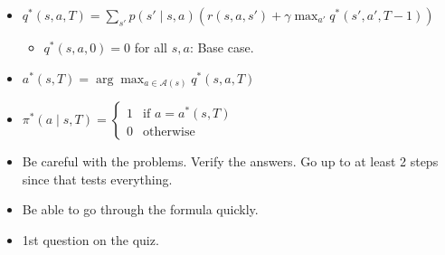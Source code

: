 \begin{warning}
    \begin{itemize}
        \item $q^*(s,a,T) = \sum_{s'} p(s' \mid s, a) \left( r(s, a, s') + \gamma \max_{a'} q^*(s',a',T-1) \right)$
        \begin{itemize}
            \item $q^*(s,a,0) = 0$ for all $s,a$: Base case.
        \end{itemize}
        \item $a^*(s,T) = \arg \max_{a \in \mathcal{A}(s)} q^* (s,a,T)$
        \item $\pi^*(a \mid s,T) = \begin{cases}
                1 & \text{if } a = a^*(s,T) \\
                0 & \text{otherwise}
            \end{cases}$ \\
    \end{itemize}
\end{warning}

\begin{warning}
    \begin{itemize}
        \item Be careful with the problems. Verify the answers. Go up to at least 2 steps since that tests everything.
        \item Be able to go through the formula quickly. 
        \item 1st question on the quiz.
    \end{itemize}
\end{warning}
\newpage

